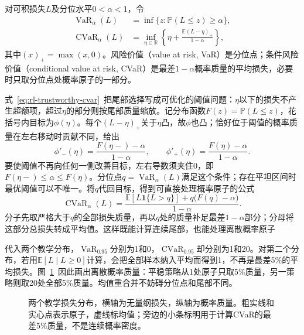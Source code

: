 \begin{definition}[损失上尾的VaR与CVaR]
  \label{def:rl-trustworthy-cvar}
  对可积损失$L$及分位水平$0<\alpha<1$，令
  \begin{align}
    \operatorname{VaR}_\alpha(L)
      &=\inf\{z:\mathbb P(L\leq z)\geq\alpha\}, \\
    \operatorname{CVaR}_\alpha(L)
      &=\inf_{\eta\in\mathbb R}
        \left\{\eta+\frac{\mathbb E(L-\eta)_+}{1-\alpha}\right\},
      \label{eq:rl-trustworthy-cvar}
  \end{align}
  其中$(x)_+=\max(x,0)$。风险价值（value at risk, VaR）是分位点；条件风险价值（conditional value at risk, CVaR）是最差$1-\alpha$概率质量的平均损失，必要时只取分位点处概率原子的一部分。
\end{definition}

式~\eqref{eq:rl-trustworthy-cvar}~把尾部选择写成可优化的阈值问题：$\eta$以下的损失不产生超额项，超过$\eta$的部分则按尾部质量缩放。记分布函数$F(z)=\mathbb P(L\leq z)$，花括号内目标为$\phi(\eta)$。每个$(L-\eta)_+$关于$\eta$凸，故$\phi$也凸；恰好位于阈值的概率质量在左右移动时贡献不同，给出
\[
  \phi'_-(\eta)=\frac{F(\eta-)-\alpha}{1-\alpha},
  \qquad
  \phi'_+(\eta)=\frac{F(\eta)-\alpha}{1-\alpha}.
\]
要使阈值不再向任何一侧改善目标，左右导数须夹住0，即
$F(\eta-)\leq\alpha\leq F(\eta)$。分位点$q=\operatorname{VaR}_\alpha(L)$满足这个条件；存在平坦区间时最优阈值可以不唯一。将$q$代回目标，得到可直接处理概率原子的公式
\begin{equation}
  \operatorname{CVaR}_\alpha(L)=
  \frac{\mathbb E[L\mathbf 1\{L>q\}]
       +q\bigl(F(q)-\alpha\bigr)}{1-\alpha}.
  \label{eq:rl-trustworthy-tail-mass}
\end{equation}
分子先取严格大于$q$的全部损失质量，再以$q$处的质量补足最差$1-\alpha$部分；分母将这部分总损失转成平均值。这样既能计算连续尾部，也能处理离散概率原子

代入两个教学分布，$\operatorname{VaR}_{0.95}$分别为1和0，$\operatorname{CVaR}_{0.95}$却分别为1和20。对第二个分布，若用$\mathbb E[L\mid L\geq0]$计算，会把全部样本纳入平均而得到1，不再是最差5\%的平均损失。图~\ref{fig:rl-trustworthy-loss}~因此画出离散概率质量：平稳策略从1处原子只取5\%质量，另一策略则取20处全部5\%质量。均值重合并不妨碍分位点和尾部不同。

\begin{figure}[htbp]
  \centering
  
  \caption{两个教学损失分布，横轴为无量纲损失，纵轴为概率质量。粗实线和实心点表示原子，虚线标均值；旁边的小条标明用于计算CVaR的最差5\%质量，不是连续概率密度。}
  \label{fig:rl-trustworthy-loss}
\end{figure}

